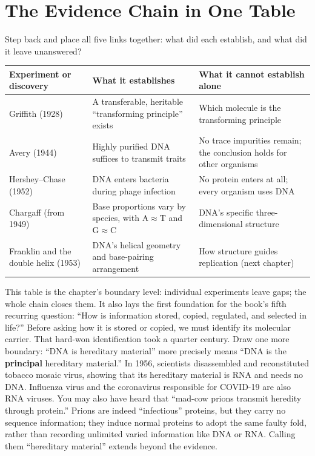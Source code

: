 \section{The Evidence Chain in One Table}

Step back and place all five links together: what did each establish, and what did it leave unanswered?

\begin{table}[htbp]
\centering
\small
\begin{tabular}{p{3.0cm}p{4.8cm}p{4.8cm}}
\toprule
Experiment or discovery & What it establishes & What it cannot establish alone \\
\midrule
Griffith (1928) & A transferable, heritable ``transforming principle'' exists & Which molecule is the transforming principle \\
Avery (1944) & Highly purified DNA suffices to transmit traits & No trace impurities remain; the conclusion holds for other organisms \\
Hershey--Chase (1952) & DNA enters bacteria during phage infection & No protein enters at all; every organism uses DNA \\
Chargaff (from 1949) & Base proportions vary by species, with A$\approx$T and G$\approx$C & DNA's specific three-dimensional structure \\
Franklin and the double helix (1953) & DNA's helical geometry and base-pairing arrangement & How structure guides replication (next chapter) \\
\bottomrule
\end{tabular}
\end{table}

This table is the chapter's boundary level: individual experiments leave gaps; the whole chain closes them. It also lays the first foundation for the book's fifth recurring question: ``How is information stored, copied, regulated, and selected in life?'' Before asking how it is stored or copied, we must identify its molecular carrier. That hard-won identification took a quarter century. Draw one more boundary: ``DNA is hereditary material'' more precisely means ``DNA is the \textbf{principal} hereditary material.'' In 1956, scientists disassembled and reconstituted tobacco mosaic virus, showing that its hereditary material is RNA and needs no DNA. Influenza virus and the coronavirus responsible for COVID-19 are also RNA viruses. You may also have heard that ``mad-cow prions transmit heredity through protein.'' Prions are indeed ``infectious'' proteins, but they carry no sequence information; they induce normal proteins to adopt the same faulty fold, rather than recording unlimited varied information like DNA or RNA. Calling them ``hereditary material'' extends beyond the evidence.

